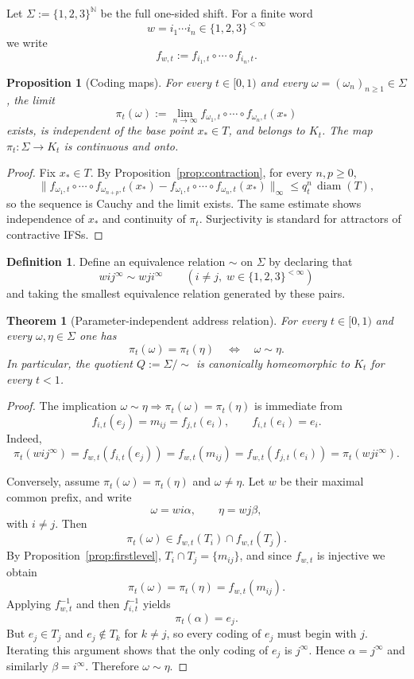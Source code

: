\documentclass[11pt]{amsart}
\newtheorem{theorem}{Theorem}[section]
\newtheorem{proposition}[proposition]{Proposition}
\theoremstyle{definition}
\newtheorem{definition}[definition]{Definition}
\newcommand{\N}{\mathbb{N}}
\newcommand{\diam}{\operatorname{diam}}
\begin{document}
Let $\Sigma:=\{1,2,3\}^{\N}$ be the full one-sided shift. For a finite word
\[
w=i_1\cdots i_n\in\{1,2,3\}^{<\infty}
\]
we write
\[
f_{w,t}:=f_{i_1,t}\circ\cdots\circ f_{i_n,t}.
\]

\begin{proposition}[Coding maps]\label{prop:coding}
For every $t\in[0,1)$ and every $\omega=(\omega_n)_{n\ge1}\in\Sigma$, the limit
\[
\pi_t(\omega):=\lim_{n\to\infty} f_{\omega_1,t}\circ\cdots\circ f_{\omega_n,t}(x_\ast)
\]
exists, is independent of the base point $x_\ast\in T$, and belongs to $K_t$. The map $\pi_t:\Sigma\to K_t$ is continuous and onto.
\end{proposition}

\begin{proof}
Fix $x_\ast\in T$. By Proposition~\ref{prop:contraction}, for every $n,p\ge0$,
\[
\bigl\|f_{\omega_1,t}\circ\cdots\circ f_{\omega_{n+p},t}(x_\ast)-f_{\omega_1,t}\circ\cdots\circ f_{\omega_n,t}(x_\ast)\bigr\|_\infty
\le q_t^n\,\diam(T),
\]
so the sequence is Cauchy and the limit exists. The same estimate shows independence of $x_\ast$ and continuity of $\pi_t$. Surjectivity is standard for attractors of contractive IFSs.
\end{proof}

\begin{definition}
Define an equivalence relation $\sim$ on $\Sigma$ by declaring that
\[
 w i j^{\infty}\sim w j i^{\infty}\qquad (i\neq j,\; w\in\{1,2,3\}^{<\infty})
\]
and taking the smallest equivalence relation generated by these pairs.
\end{definition}

\begin{theorem}[Parameter-independent address relation]\label{thm:addressrelation}
For every $t\in[0,1)$ and every $\omega,\eta\in\Sigma$ one has
\[
\pi_t(\omega)=\pi_t(\eta)\quad\Longleftrightarrow\quad \omega\sim\eta.
\]
In particular, the quotient $Q:=\Sigma/\!\sim$ is canonically homeomorphic to $K_t$ for every $t<1$.
\end{theorem}

\begin{proof}
The implication $\omega\sim\eta\Rightarrow \pi_t(\omega)=\pi_t(\eta)$ is immediate from
\[
 f_{i,t}(e_j)=m_{ij}=f_{j,t}(e_i),\qquad f_{i,t}(e_i)=e_i.
\]
Indeed,
\[
\pi_t(w i j^\infty)=f_{w,t}(f_{i,t}(e_j))=f_{w,t}(m_{ij})=f_{w,t}(f_{j,t}(e_i))=\pi_t(w j i^\infty).
\]

Conversely, assume $\pi_t(\omega)=\pi_t(\eta)$ and $\omega\neq\eta$. Let $w$ be their maximal common prefix, and write
\[
\omega=w i\alpha,\qquad \eta=w j\beta,
\]
with $i\neq j$. Then
\[
\pi_t(\omega)\in f_{w,t}(T_i)\cap f_{w,t}(T_j).
\]
By Proposition~\ref{prop:firstlevel}, $T_i\cap T_j=\{m_{ij}\}$, and since $f_{w,t}$ is injective we obtain
\[
\pi_t(\omega)=\pi_t(\eta)=f_{w,t}(m_{ij}).
\]
Applying $f_{w,t}^{-1}$ and then $f_{i,t}^{-1}$ yields
\[
\pi_t(\alpha)=e_j.
\]
But $e_j\in T_j$ and $e_j\notin T_k$ for $k\neq j$, so every coding of $e_j$ must begin with $j$. Iterating this argument shows that the only coding of $e_j$ is $j^\infty$. Hence $\alpha=j^\infty$ and similarly $\beta=i^\infty$. Therefore $\omega\sim\eta$.
\end{proof}
\end{document}
